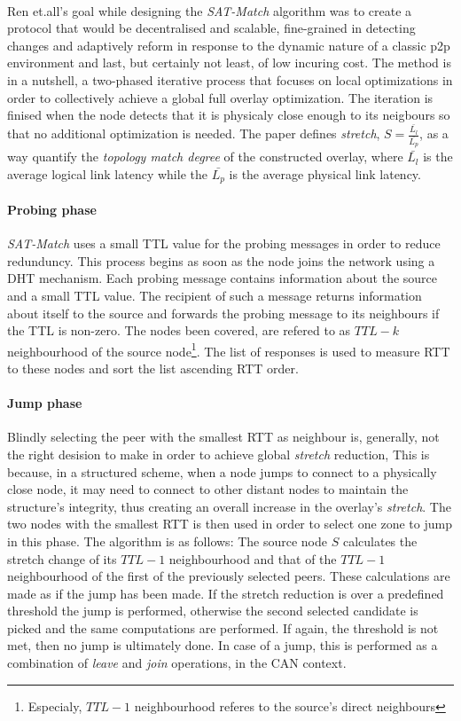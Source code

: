 \documentclass[a4paper,10pt]{article}
\begin{document}
\paragraph{}
Ren et.all's goal while designing the \emph{SAT-Match} algorithm \cite{ren_satmatch_2004} was to create a protocol that would be decentralised and scalable, fine-grained in detecting changes and adaptively reform in response to the dynamic nature of a classic p2p environment and last, but certainly not least, of low incuring cost. The method is in a nutshell, a two-phased iterative process that focuses on local optimizations in order to collectively achieve a global full overlay optimization.  The iteration is finised when the node detects that it is physicaly close enough to its neigbours so that no additional optimization is needed. The paper defines \emph{stretch}, $S = \frac{\bar{L_l}}{\bar{L_p}}$, as a way quantify the \emph{topology match degree} of the constructed overlay, where $\bar{L_l}$ is the average logical link latency while the $\bar{L_p}$ is the average physical link latency.

\paragraph{Probing phase}
\emph{SAT-Match} uses a small TTL value for the probing messages in order to reduce redunduncy\cite{jiang_lightflood_2008}. This process begins as soon as the node joins the network using a DHT mechanism. Each probing message contains information about the source and a small TTL value. The recipient of such a message returns information about itself to the source and forwards the probing message to its neighbours if the TTL is non-zero. The nodes been covered, are refered to as $TTL-k$ neighbourhood of the source node\footnote{Especialy, $TTL-1$ neighbourhood referes to the source's direct neighbours}. The list of responses is used to measure RTT to these nodes and sort the list ascending RTT order.

\paragraph{Jump phase}
Blindly selecting the peer with the smallest RTT as neighbour is, generally, not the right desision to make in order to achieve global \emph{stretch} reduction, This is because, in a structured scheme, when a node jumps to connect to a physically close node, it may need to connect to other distant nodes to maintain the structure's integrity, thus creating an overall increase in the overlay's \emph{stretch}. The two nodes with the smallest RTT is then used in order to select one zone to jump in this phase. The algorithm is as follows: The source node $S$ calculates the stretch change of its $TTL-1$ neighbourhood and that of the $TTL-1$ neighbourhood of the first of the previously selected peers. These calculations are made as if the jump has been made. If the stretch reduction is over a predefined threshold the jump is performed, otherwise the second selected candidate is picked and the same computations are performed. If again, the threshold is not met, then no jump is ultimately done. In case of a jump, this is performed as a combination of \emph{leave} and \emph{join} operations, in the CAN context.
\end{document}
